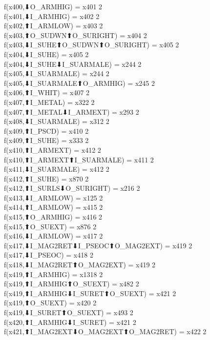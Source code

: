 f(x400,⬇O_ARMHIG) = x401 {2} \\
f(x401,⬇I_ARMHIG) = x402 {2} \\
f(x402,⬆I_ARMLOW) = x403 {2} \\
f(x403,⬆O_SUDWN⬆O_SURIGHT) = x404 {2} \\
f(x403,⬇I_SUHE⬆O_SUDWN⬆O_SURIGHT) = x405 {2} \\
f(x404,⬇I_SUHE) = x405 {2} \\
f(x404,⬇I_SUHE⬇I_SUARMALE) = x244 {2} \\
f(x405,⬇I_SUARMALE) = x244 {2} \\
f(x405,⬇I_SUARMALE⬆O_ARMHIG) = x245 {2} \\
f(x406,⬆I_WHIT) = x407 {2} \\
f(x407,⬆I_METAL) = x322 {2} \\
f(x407,⬆I_METAL⬇I_ARMEXT) = x293 {2} \\
f(x408,⬇I_SUARMALE) = x312 {2} \\
f(x409,⬆I_PSCD) = x410 {2} \\
f(x409,⬆I_SUHE) = x333 {2} \\
f(x410,⬆I_ARMEXT) = x412 {2} \\
f(x410,⬆I_ARMEXT⬆I_SUARMALE) = x411 {2} \\
f(x411,⬇I_SUARMALE) = x412 {2} \\
f(x412,⬆I_SUHE) = x870 {2} \\
f(x412,⬆I_SURLS⬇O_SURIGHT) = x216 {2} \\
f(x413,⬇I_ARMLOW) = x125 {2} \\
f(x414,⬆I_ARMLOW) = x415 {2} \\
f(x415,⬆O_ARMHIG) = x416 {2} \\
f(x415,⬆O_SUEXT) = x876 {2} \\
f(x416,⬇I_ARMLOW) = x417 {2} \\
f(x417,⬇I_MAG2RET⬇I_PSEOC⬆O_MAG2EXT) = x419 {2} \\
f(x417,⬇I_PSEOC) = x418 {2} \\
f(x418,⬇I_MAG2RET⬆O_MAG2EXT) = x419 {2} \\
f(x419,⬆I_ARMHIG) = x1318 {2} \\
f(x419,⬆I_ARMHIG⬆O_SUEXT) = x482 {2} \\
f(x419,⬆I_ARMHIG⬇I_SURET⬆O_SUEXT) = x421 {2} \\
f(x419,⬆O_SUEXT) = x420 {2} \\
f(x419,⬇I_SURET⬆O_SUEXT) = x493 {2} \\
f(x420,⬆I_ARMHIG⬇I_SURET) = x421 {2} \\
f(x421,⬆I_MAG2EXT⬇O_MAG2EXT⬆O_MAG2RET) = x422 {2} \\
